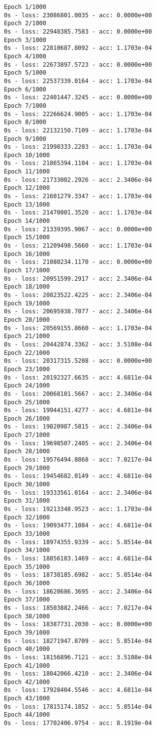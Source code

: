 \documentclass[11pt]{article}
\begin{document}
    \begin{Verbatim}[commandchars=\\\{\}]
Epoch 1/1000
0s - loss: 23086801.0035 - acc: 0.0000e+00
Epoch 2/1000
0s - loss: 22948385.7583 - acc: 0.0000e+00
Epoch 3/1000
0s - loss: 22810687.8092 - acc: 1.1703e-04
Epoch 4/1000
0s - loss: 22673897.5723 - acc: 0.0000e+00
Epoch 5/1000
0s - loss: 22537339.0164 - acc: 1.1703e-04
Epoch 6/1000
0s - loss: 22401447.3245 - acc: 0.0000e+00
Epoch 7/1000
0s - loss: 22266624.9005 - acc: 1.1703e-04
Epoch 8/1000
0s - loss: 22132150.7109 - acc: 1.1703e-04
Epoch 9/1000
0s - loss: 21998333.2203 - acc: 1.1703e-04
Epoch 10/1000
0s - loss: 21865394.1104 - acc: 1.1703e-04
Epoch 11/1000
0s - loss: 21733002.2926 - acc: 2.3406e-04
Epoch 12/1000
0s - loss: 21601279.3347 - acc: 1.1703e-04
Epoch 13/1000
0s - loss: 21470001.3520 - acc: 1.1703e-04
Epoch 14/1000
0s - loss: 21339395.9067 - acc: 0.0000e+00
Epoch 15/1000
0s - loss: 21209498.5660 - acc: 1.1703e-04
Epoch 16/1000
0s - loss: 21080234.1170 - acc: 0.0000e+00
Epoch 17/1000
0s - loss: 20951599.2917 - acc: 2.3406e-04
Epoch 18/1000
0s - loss: 20823522.4225 - acc: 2.3406e-04
Epoch 19/1000
0s - loss: 20695938.7077 - acc: 2.3406e-04
Epoch 20/1000
0s - loss: 20569155.8660 - acc: 1.1703e-04
Epoch 21/1000
0s - loss: 20442874.3362 - acc: 3.5108e-04
Epoch 22/1000
0s - loss: 20317315.5208 - acc: 0.0000e+00
Epoch 23/1000
0s - loss: 20192327.6635 - acc: 4.6811e-04
Epoch 24/1000
0s - loss: 20068101.5667 - acc: 2.3406e-04
Epoch 25/1000
0s - loss: 19944151.4277 - acc: 4.6811e-04
Epoch 26/1000
0s - loss: 19820987.5815 - acc: 2.3406e-04
Epoch 27/1000
0s - loss: 19698507.2405 - acc: 2.3406e-04
Epoch 28/1000
0s - loss: 19576494.8868 - acc: 7.0217e-04
Epoch 29/1000
0s - loss: 19454682.0149 - acc: 4.6811e-04
Epoch 30/1000
0s - loss: 19333561.0164 - acc: 2.3406e-04
Epoch 31/1000
0s - loss: 19213348.9523 - acc: 1.1703e-04
Epoch 32/1000
0s - loss: 19093477.1084 - acc: 4.6811e-04
Epoch 33/1000
0s - loss: 18974355.9339 - acc: 5.8514e-04
Epoch 34/1000
0s - loss: 18856183.1469 - acc: 4.6811e-04
Epoch 35/1000
0s - loss: 18738185.6982 - acc: 5.8514e-04
Epoch 36/1000
0s - loss: 18620686.3695 - acc: 2.3406e-04
Epoch 37/1000
0s - loss: 18503882.2466 - acc: 7.0217e-04
Epoch 38/1000
0s - loss: 18387731.2030 - acc: 0.0000e+00
Epoch 39/1000
0s - loss: 18271947.8709 - acc: 5.8514e-04
Epoch 40/1000
0s - loss: 18156896.7121 - acc: 3.5108e-04
Epoch 41/1000
0s - loss: 18042066.4210 - acc: 2.3406e-04
Epoch 42/1000
0s - loss: 17928404.5546 - acc: 4.6811e-04
Epoch 43/1000
0s - loss: 17815174.1852 - acc: 5.8514e-04
Epoch 44/1000
0s - loss: 17702406.9754 - acc: 8.1919e-04

\end{Verbatim}
\end{document}
